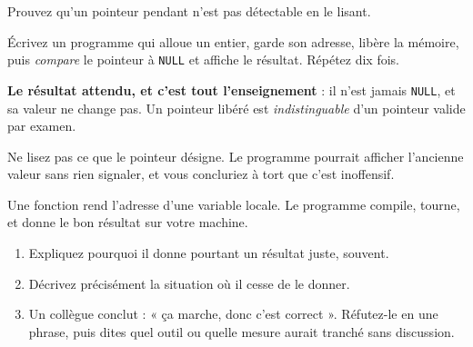 \begin{nkdemo}
Prouvez qu'un pointeur pendant n'est pas détectable en le lisant.

Écrivez un programme qui alloue un entier, garde son adresse, libère la mémoire,
puis \emph{compare} le pointeur à \texttt{NULL} et affiche le résultat. Répétez
dix fois.

\textbf{Le résultat attendu, et c'est tout l'enseignement} : il n'est jamais
\texttt{NULL}, et sa valeur ne change pas. Un pointeur libéré est
\emph{indistinguable} d'un pointeur valide par examen.

\alerte{} Ne lisez pas ce que le pointeur désigne. Le programme pourrait afficher
l'ancienne valeur sans rien signaler, et vous concluriez à tort que c'est
inoffensif.
\end{nkdemo}

\begin{nklogique}
Une fonction rend l'adresse d'une variable locale. Le programme compile, tourne,
et donne le bon résultat sur votre machine.

\begin{enumerate}
\item Expliquez pourquoi il donne pourtant un résultat juste, souvent.
\item Décrivez précisément la situation où il cesse de le donner.
\item Un collègue conclut : « ça marche, donc c'est correct ». Réfutez-le en une
      phrase, puis dites quel outil ou quelle mesure aurait tranché sans
      discussion.
\end{enumerate}
\end{nklogique}
